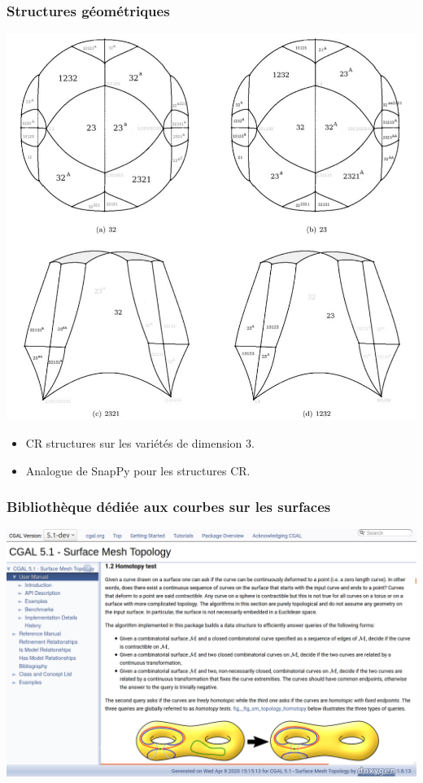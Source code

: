 \documentclass[a4paper,compress]{beamer}  %
\theoremstyle{definition}
\begin{document}
\begin{frame}
  \frametitle{Structures géométriques}
\centerline{\includegraphics[width=.5\linewidth]{Ford-domain.png}
  }
  \begin{itemize}
  \item CR structures sur les variétés de dimension 3.
    \item Analogue de SnapPy pour les structures CR.
  \end{itemize}
\end{frame}
\begin{frame}
  \frametitle{Bibliothèque dédiée aux courbes sur les surfaces}
\centerline{\includegraphics[height=.7\textheight]{CGAL_Surface_Mesh_Topology.png}}
\end{frame}
\end{document}
